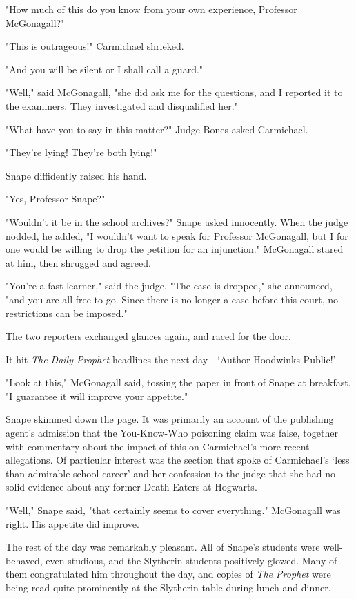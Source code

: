 "How much of this do you know from your own experience, Professor McGonagall?"

"This is outrageous!" Carmichael shrieked.

"And you will be silent or I shall call a guard."

"Well," said McGonagall, "she did ask me for the questions, and I reported it to the examiners. They investigated and disqualified her."

"What have you to say in this matter?" Judge Bones asked Carmichael.

"They're lying! They're both lying!"

Snape diffidently raised his hand.

"Yes, Professor Snape?"

"Wouldn't it be in the school archives?" Snape asked innocently. When the judge nodded, he added, "I wouldn't want to speak for Professor McGonagall, but I for one would be willing to drop the petition for an injunction." McGonagall stared at him, then shrugged and agreed.

"You're a fast learner," said the judge. "The case is dropped," she announced, "and you are all free to go. Since there is no longer a case before this court, no restrictions can be imposed."

The two reporters exchanged glances again, and raced for the door.

It hit \emph{The Daily Prophet} headlines the next day - `Author Hoodwinks Public!'

"Look at this," McGonagall said, tossing the paper in front of Snape at breakfast. "I guarantee it will improve your appetite."

Snape skimmed down the page. It was primarily an account of the publishing agent's admission that the You-Know-Who poisoning claim was false, together with commentary about the impact of this on Carmichael's more recent allegations. Of particular interest was the section that spoke of Carmichael's `less than admirable school career' and her confession to the judge that she had no solid evidence about any former Death Eaters at Hogwarts.

"Well," Snape said, "that certainly seems to cover everything." McGonagall was right. His appetite did improve.

The rest of the day was remarkably pleasant. All of Snape's students were well-behaved, even studious, and the Slytherin students positively glowed. Many of them congratulated him throughout the day, and copies of \emph{The Prophet} were being read quite prominently at the Slytherin table during lunch and dinner.


